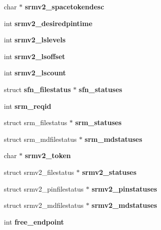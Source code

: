 \begin{DoxyCompactItemize}
\item 
char $\ast$ {\bfseries srmv2\_\-spacetokendesc}\label{structgfal__handle___a028fb6ab246db3b6f2e38d32ba86d24b}

\item 
int {\bfseries srmv2\_\-desiredpintime}\label{structgfal__handle___a023571e8f43000a62d87e6db5deeb841}

\item 
int {\bfseries srmv2\_\-lslevels}\label{structgfal__handle___a7f0c1a1b5f87f0f9c3dd6c8e7182de02}

\item 
int {\bfseries srmv2\_\-lsoffset}\label{structgfal__handle___a558b5a43a7da7d14b8633426204a41d1}

\item 
int {\bfseries srmv2\_\-lscount}\label{structgfal__handle___a18ebff29d25f772d1c513ac5ea00e911}

\item 
struct {\bf sfn\_\-filestatus} $\ast$ {\bfseries sfn\_\-statuses}\label{structgfal__handle___a3f9deb3953c0e0640b2aa6571c19457f}

\item 
int {\bfseries srm\_\-reqid}\label{structgfal__handle___a4bd52a4218e8019d9f9876c3ce96b76b}

\item 
struct srm\_\-filestatus $\ast$ {\bfseries srm\_\-statuses}\label{structgfal__handle___a5e70b99e29e92db90672d14a5b31f8f1}

\item 
struct srm\_\-mdfilestatus $\ast$ {\bfseries srm\_\-mdstatuses}\label{structgfal__handle___ab3e1ff7dd4074825efea86ae40ea89c5}

\item 
char $\ast$ {\bfseries srmv2\_\-token}\label{structgfal__handle___adfd41a0232fed17926b263d0ec587a47}

\item 
struct srmv2\_\-filestatus $\ast$ {\bfseries srmv2\_\-statuses}\label{structgfal__handle___affaec1ae9690227d14a7f676832cff02}

\item 
struct srmv2\_\-pinfilestatus $\ast$ {\bfseries srmv2\_\-pinstatuses}\label{structgfal__handle___ab3793724326b5cd8aef63fc3b3671e3f}

\item 
struct srmv2\_\-mdfilestatus $\ast$ {\bfseries srmv2\_\-mdstatuses}\label{structgfal__handle___a73524e147b062b986c536eb3a9e90fc9}

\item 
int {\bfseries free\_\-endpoint}\label{structgfal__handle___ad3b3e043625abb51b36ec4c146d6a4ff}


\end{DoxyCompactItemize}
